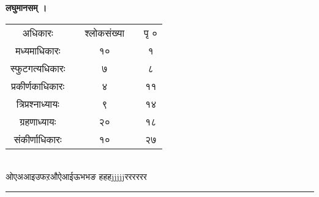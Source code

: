 \documentclass[11pt, openany]{book}
\begin{document}
\newpage
\thispagestyle{empty}
\textbf{\large{ लघुमानसम् ।}}\\
\vspace{5mm}
\begin{tabular}{ c  c  c  c  c } 
अधिकारः &  &  श्लोकसंख्या &  &  पृ ०  \\
मध्यमाधिकारः &  & १० &  &  १ \\
स्फुटगत्यधिकारः  &   & ७ &  & ८ \\
प्रकीर्णकाधिकारः &  & ४  &  & ११ \\
त्रिप्रश्नाध्यायः &   & ९  &   &  १४ \\
ग्रहणाध्यायः &   & २० &   & १८ \\
संकीर्णाधिकारः &   &  १० &  & २७ \\
\end{tabular}\\


ओएअआइउफऱऔऐआईऊभभङ
हहहjjjjjरररररर



\vspace{5mm}
\rule{0.2\linewidth}{1.0pt}
\end{document}
